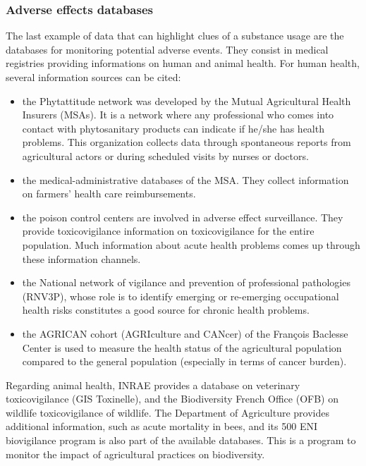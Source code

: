 
\subsubsection{Adverse effects databases}

The last example of data that can highlight clues of a substance usage are the databases for monitoring potential adverse events. They consist in medical registries providing informations on human and animal health.  
For human health, several information sources can be cited: 
\begin{itemize}
\item the Phytattitude network was developed by the Mutual Agricultural Health Insurers (MSAs). It is a network where any professional who comes into contact with phytosanitary products can indicate if he/she has health problems. This organization collects data through spontaneous reports from agricultural actors or during scheduled visits by nurses or doctors.
\item the medical-administrative databases of the MSA. They collect information on farmers' health care reimbursements.
\item the poison control centers are involved in adverse effect surveillance. They provide toxicovigilance information on toxicovigilance for the entire population. Much information about acute health problems comes up through these information channels.
\item the National network of vigilance and prevention of professional pathologies (RNV3P), whose role is to identify emerging or re-emerging occupational health risks constitutes a good source for chronic health problems.
\item the AGRICAN cohort (AGRIculture and CANcer) of the François Baclesse Center is used to measure the health status of the agricultural population compared to the general population (especially in terms of cancer burden).
\end{itemize}

Regarding animal health, INRAE provides a database on veterinary toxicovigilance (GIS Toxinelle), and the Biodiversity French Office (OFB) on wildlife toxicovigilance of wildlife. The Department of Agriculture provides additional information, such as acute mortality in bees, and its 500 ENI biovigilance program is also part of the available databases. This is a program to monitor the impact of agricultural practices on biodiversity.


